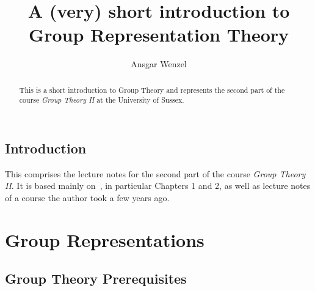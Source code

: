 \documentclass[a4paper,12pt,reqno]{amsbook}%
\theoremstyle{plain}
\numberwithin{equation}{section}
\begin{document}
\frontmatter
\title[Group Representation Theory]{A (very) short introduction to Group Representation Theory}
\author[A. Wenzel]{Ansgar Wenzel}
\address[]{Chichester, 3R400%
\hspace*{\fill}\linebreak\indent%
University of Sussex}%

\begin{abstract}
This is a short introduction to Group Theory and represents the second part of the course \emph{Group Theory II} at the University of Sussex.\end{abstract}
\maketitle
\tableofcontents


\chapter*{Introduction}

 This comprises the lecture notes for the second part of the course \emph{Group Theory II}. It is based mainly on~\cite{Sagan}, in particular Chapters 1 and 2, as well as lecture notes of a course the author took a few years ago.

\mainmatter

\part{Group Representations}

\chapter{Group Theory Prerequisites}
\end{document}
